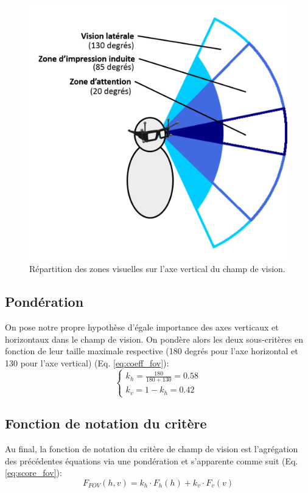 	\begin{figure}
		\centering
		\includegraphics[scale=.6]{Figures/ChampVisionVertical}
		\caption{Répartition des zones visuelles sur l'axe vertical du champ de vision.}
		\label{fig:champ_vision_vertical}
	\end{figure}
	
	\subsection{Pondération}
	\par On pose notre propre hypothèse d'égale importance des axes verticaux et horizontaux dans le champ de vision. On pondère alors les deux sous-critères en fonction de leur taille maximale respective (180 degrés pour l'axe horizontal et 130 pour l'axe vertical) (Eq. \ref{eq:coeff_fov}):
	\begin{equation}
		\begin{cases}	
			k_h = \frac{180}{180 + 130} = 0.58\\
			k_v = 1 - k_h = 0.42
		\end{cases}
		\label{eq:coeff_fov}
	\end{equation}
	
	\subsection{Fonction de notation du critère}
	\par Au final, la fonction de notation du critère de champ de vision est l'agrégation des précédentes équations via une pondération et s'apparente comme suit (Eq. \ref{eq:score_fov}):
	\begin{equation}
	F_{FOV}(h,v) = k_h \cdot F_h(h) + k_v \cdot F_v(v)
	\label{eq:score_fov}
	\end{equation}

